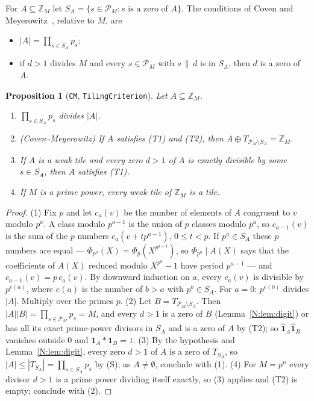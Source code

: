 \documentclass[11pt,a4paper]{amsart}
\newtheorem{proposition}[theorem]{Proposition}
\theoremstyle{definition}
\theoremstyle{remark}
\newcommand{\Z}{\mathbb{Z}}
\newcommand{\one}{\mathbf{1}}
\newcommand{\lean}[1]{\texttt{#1}}
\begin{document}
For $A\subseteq\Z_M$ let $S_A=\{s\in\mathcal P_M: s\text{ is a zero of }A\}$. The conditions of Coven and
Meyerowitz~\cite{CM}, relative to $M$, are
\begin{itemize}
\item[\textup{(T1)}] $|A|=\prod_{s\in S_A}p_s$;
\item[\textup{(T2)}] if $d>1$ divides $M$ and every $s\in\mathcal P_M$ with $s\,\|\,d$ is in $S_A$, then $d$ is a zero of $A$.
\end{itemize}

\begin{proposition}[\lean{CM}, \lean{TilingCriterion}]\label{N:prop:CM}
Let $A\subseteq\Z_M$.
\begin{enumerate}
\item $\prod_{s\in S_A}p_s$ divides $|A|$.
\item \textup{(Coven--Meyerowitz)} If $A$ satisfies \textup{(T1)} and \textup{(T2)}, then
 $A\oplus T_{\mathcal P_M\setminus S_A}=\Z_M$.
\item If $A$ is a weak tile and every zero $d>1$ of $A$ is exactly divisible by some $s\in S_A$, then $A$ satisfies
 \textup{(T1)}.
\item If $M$ is a prime power, every weak tile of $\Z_M$ is a tile.
\end{enumerate}
\end{proposition}
\begin{proof}
(1) Fix $p$ and let $c_a(v)$ be the number of elements of $A$ congruent to $v$ modulo $p^a$. A class modulo
$p^{a-1}$ is the union of $p$ classes modulo $p^a$, so $c_{a-1}(v)$ is the sum of the $p$ numbers
$c_a(v+tp^{a-1})$, $0\le t<p$. If $p^a\in S_A$ these $p$ numbers are equal --- $\Phi_{p^a}(X)=\Phi_p(X^{p^{a-1}})$,
so $\Phi_{p^a}\mid A(X)$ says that the coefficients of $A(X)$ reduced modulo $X^{p^a}-1$ have period $p^{a-1}$ ---
and $c_{a-1}(v)=p\,c_a(v)$. By downward induction on $a$, every $c_a(v)$ is divisible by $p^{e(a)}$, where $e(a)$ is
the number of $b>a$ with $p^b\in S_A$. For $a=0$: $p^{e(0)}$ divides $|A|$. Multiply over the primes $p$. (2) Let $B=T_{\mathcal P_M\setminus S_A}$.
Then $|A||B|=\prod_{s\in\mathcal P_M}p_s=M$, and every $d>1$ is a zero of $B$ (Lemma~\ref{N:lem:digit}) or has all
its exact prime-power divisors in $S_A$ and is a zero of $A$ by (T2); so $\hat{\one}_A\hat{\one}_B$ vanishes
outside $0$ and $\one_A*\one_B=1$. (3) By the hypothesis and Lemma~\ref{N:lem:digit}, every zero $d>1$ of $A$ is a zero of $T_{S_A}$, so
$|A|\le|T_{S_A}|=\prod_{s\in S_A}p_s$ by (S); as $A\ne\emptyset$, conclude with (1). (4) For $M=p^n$ every divisor $d>1$ is a prime
power dividing itself exactly, so (3) applies and (T2) is empty; conclude with (2).
\end{proof}
\end{document}
